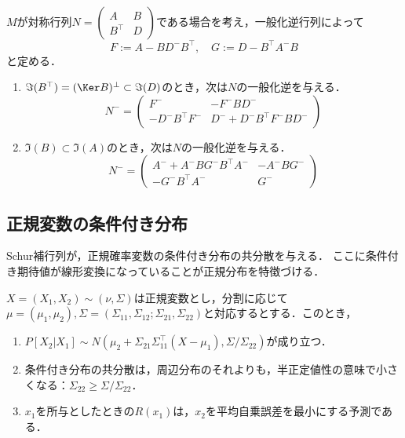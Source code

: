 \documentclass[uplatex, dvipdfmx]{jsreport}
\begin{document}
\begin{proposition}
    $M$が対称行列$N=\begin{pmatrix}A&B\\B^\top&D\end{pmatrix}$である場合を考え，一般化逆行列によって
    \[F:=A-BD^-B^\top,\quad G:=D-B^\top A^-B\]
    と定める．
    \begin{enumerate}
        \item $\Im(B^\top)=(\Ker B)^\perp\subset\Im(D)$のとき，次は$N$の一般化逆を与える．
        \[N^-=\begin{pmatrix}F^-&-F^-BD^-\\-D^-B^\top F^-&D^-+D^-B^\top F^-BD^-\end{pmatrix}\]
        \item $\Im(B)\subset\Im(A)$のとき，次は$N$の一般化逆を与える．
        \[N^-=\begin{pmatrix}A^-+A^-BG^-B^\top A^-&-A^-BG^-\\-G^-B^\top A^-&G^-\end{pmatrix}\]
    \end{enumerate}
\end{proposition}

\subsection{正規変数の条件付き分布}

\begin{tcolorbox}[colframe=ForestGreen, colback=ForestGreen!10!white,breakable,colbacktitle=ForestGreen!40!white,coltitle=black,fonttitle=\bfseries\sffamily,
title=]
    Schur補行列が，正規確率変数の条件付き分布の共分散を与える．
    ここに条件付き期待値が線形変換になっていることが正規分布を特徴づける．
\end{tcolorbox}

\begin{proposition}
    $X=(X_1,X_2)\sim(\nu,\Sigma)$は正規変数とし，分割に応じて$\mu=(\mu_1,\mu_2),\Sigma=(\Sigma_{11},\Sigma_{12};\Sigma_{21},\Sigma_{22})$と対応するとする．このとき，
    \begin{enumerate}
        \item $P[X_2|X_1]\sim N(\mu_2+\Sigma_{21}\Sigma_{11}^\top(X-\mu_1),\Sigma/\Sigma_{22})$が成り立つ．
        \item 条件付き分布の共分散は，周辺分布のそれよりも，半正定値性の意味で小さくなる：$\Sigma_{22}\ge\Sigma/\Sigma_{22}$．
        \item $x_1$を所与としたときの$R(x_1)$は，$x_2$を平均自乗誤差を最小にする予測である．
    \end{enumerate}
\end{proposition}
\end{document}
